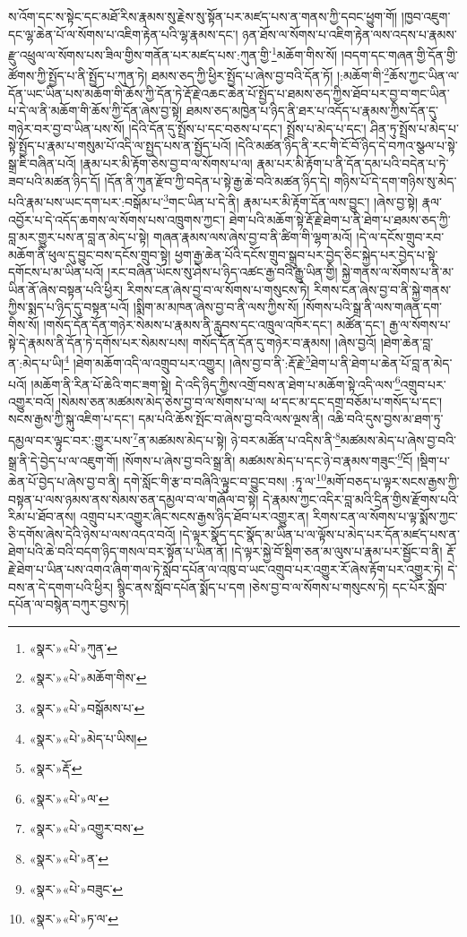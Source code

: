 ས་འོག་དང་ས་སྟེང་དང་མཐོ་རིས་རྣམས་སུ་རྗེས་སུ་སྟོན་པར་མཛད་པས་ན་གནས་ཀྱི་དབང་ཕྱུག་གོ། །ཁྱབ་འཇུག་དང་ལྷ་ཆེན་པོ་ལ་སོགས་པ་འཇིག་རྟེན་པའི་ལྷ་རྣམས་དང་། ཉན་ཐོས་ལ་སོགས་པ་འཇིག་རྟེན་ལས་འདས་པ་རྣམས་རྫུ་འཕྲུལ་ལ་སོགས་པས་ཟིལ་གྱིས་གནོན་པར་མཛད་པས་:ཀུན་གྱི་\footnote{«སྣར་»«པེ་»ཀུན་}མཆོག་གིས་སོ། །བདག་དང་གཞན་གྱི་དོན་གྱི་ཚོགས་ཀྱི་སྤྱོད་པ་ནི་སྤྱོད་པ་ཀུན་ཏེ། ཐམས་ཅད་ཀྱི་ཕྱིར་སྤྱོད་པ་ཞེས་བྱ་བའི་དོན་ཏོ། །:མཆོག་གི་\footnote{«སྣར་»«པེ་»མཆོག་གིས་}ཆོས་ཀྱང་ཡིན་ལ་དོན་ཡང་ཡིན་པས་མཆོག་གི་ཆོས་ཀྱི་དོན་ཏེ་རྡོ་རྗེ་འཆང་ཆེན་པོ་སྤྱོད་པ་ཐམས་ཅད་ཀྱིས་ཐོབ་པར་བྱ་བ་གང་ཡིན་པ་དེ་ལ་ནི་མཆོག་གི་ཆོས་ཀྱི་དོན་ཞེས་བྱ་སྟེ། ཐམས་ཅད་མཁྱེན་པ་ཉིད་ནི་ཐར་པ་འདོད་པ་རྣམས་ཀྱིས་དོན་དུ་གཉེར་བར་བྱ་བ་ཡིན་པས་སོ། །དེའི་དོན་དུ་སྤྲོས་པ་དང་བཅས་པ་དང་། སྤྲོས་པ་མེད་པ་དང་། ཤིན་ཏུ་སྤྲོས་པ་མེད་པ་སྟེ་སྤྱོད་པ་རྣམ་པ་གསུམ་པོ་འདི་ལ་སྤྱད་པས་ན་སྤྱོད་པའོ། །དེའི་མཚན་ཉིད་ནི་རང་གི་ངོ་བོ་ཉིད་དེ་བཀའ་སྩལ་པ་སྟེ་སྒྲ་ཇི་བཞིན་པའོ། །རྣམ་པར་མི་རྟོག་ཅེས་བྱ་བ་ལ་སོགས་པ་ལ། རྣམ་པར་མི་རྟོག་པ་ནི་དོན་དམ་པའི་བདེན་པ་ཏེ་ཟབ་པའི་མཚན་ཉིད་དོ། །དོན་ནི་ཀུན་རྫོབ་ཀྱི་བདེན་པ་སྟེ་རྒྱ་ཆེ་བའི་མཚན་ཉིད་དེ། གཉིས་པོ་དེ་དག་གཉིས་སུ་མེད་པའི་རྣམ་པས་ཡང་དག་པར་:བསྒོམ་པ་\footnote{«སྣར་»«པེ་»བསྒོམས་པ་}གང་ཡིན་པ་དེ་ནི། རྣམ་པར་མི་རྟོག་དོན་ལས་བྱུང་། །ཞེས་བྱ་སྟེ། རྣལ་འབྱོར་པ་དེ་འདོད་ཆགས་ལ་སོགས་པས་འཁྲུགས་ཀྱང་། ཐེག་པའི་མཆོག་སྟེ་རྡོ་རྗེ་ཐེག་པ་ནི་ཐེག་པ་ཐམས་ཅད་ཀྱི་བླ་མར་གྱུར་པས་ན་བླ་ན་མེད་པ་སྟེ། གཞན་རྣམས་ལས་ཞེས་བྱ་བ་ནི་ཚིག་གི་ལྷག་མའོ། །དེ་ལ་དངོས་གྲུབ་རབ་མཆོག་ནི་ཕུལ་དུ་བྱུང་བས་དངོས་གྲུབ་སྟེ། ཕྱག་རྒྱ་ཆེན་པོའི་དངོས་གྲུབ་སྒྲུབ་པར་བྱེད་ཅིང་སྐྱེད་པར་བྱེད་པ་སྟེ་དགོངས་པ་མ་ཡིན་པའོ། །རང་བཞིན་ཡོངས་སུ་ཤེས་པ་ཉིད་འཚང་རྒྱ་བའི་རྒྱུ་ཡིན་གྱི། སྐྱེ་གནས་ལ་སོགས་པ་ནི་མ་ཡིན་ནོ་ཞེས་བསྟན་པའི་ཕྱིར། རིགས་ངན་ཞེས་བྱ་བ་ལ་སོགས་པ་གསུངས་ཏེ། རིགས་ངན་ཞེས་བྱ་བ་ནི་སྐྱེ་གནས་ཀྱིས་སྨད་པ་ཉིད་དུ་བསྟན་པའོ། །སྨིག་མ་མཁན་ཞེས་བྱ་བ་ནི་ལས་ཀྱིས་སོ། །སོགས་པའི་སྒྲ་ནི་ལས་གཞན་དག་གིས་སོ། །གསོད་དོན་དོན་གཉེར་སེམས་པ་རྣམས་ནི་རླུབས་དང་འཁྲུལ་འཁོར་དང་། མཚོན་དང་། རྒྱ་ལ་སོགས་པ་སྟེ་དེ་རྣམས་ནི་དོན་ཏེ་དགོས་པར་སེམས་པས། གསོད་དོན་དོན་དུ་གཉེར་བ་རྣམས། །ཞེས་བྱའོ། །ཐེག་ཆེན་བླ་ན་:མེད་པ་ཡི།\footnote{«སྣར་»«པེ་»མེད་པ་ཡིས།} །ཐེག་མཆོག་འདི་ལ་འགྲུབ་པར་འགྱུར། །ཞེས་བྱ་བ་ནི་:རྡོ་རྗེ་\footnote{«སྣར་»རྡོ་}ཐེག་པ་ནི་ཐེག་པ་ཆེན་པོ་བླ་ན་མེད་པའོ། །མཆོག་ནི་རིན་པོ་ཆེའི་གང་ཟག་སྟེ། དེ་འདི་ཉིད་ཀྱིས་འགྲོ་བས་ན་ཐེག་པ་མཆོག་སྟེ་འདི་ལས་\footnote{«སྣར་»«པེ་»ལ་}འགྲུབ་པར་འགྱུར་བའོ། །སེམས་ཅན་མཚམས་མེད་ཅེས་བྱ་བ་ལ་སོགས་པ་ལ། ཕ་དང་མ་དང་དགྲ་བཅོམ་པ་གསོད་པ་དང་། སངས་རྒྱས་ཀྱི་སྐུ་འཇིག་པ་དང་། དམ་པའི་ཆོས་སྤོང་བ་ཞེས་བྱ་བའི་ལས་ལྔས་ནི། འཆི་བའི་དུས་བྱས་མ་ཐག་ཏུ་དམྱལ་བར་ལྟུང་བར་:གྱུར་པས་\footnote{«སྣར་»«པེ་»འགྱུར་བས་}ན་མཚམས་མེད་པ་སྟེ། ཉེ་བར་མཚོན་པ་འདིས་ནི་\footnote{«སྣར་»«པེ་»ན་}མཚམས་མེད་པ་ཞེས་བྱ་བའི་སྒྲ་ནི་དེ་བྱེད་པ་ལ་འཇུག་གོ། །སོགས་པ་ཞེས་བྱ་བའི་སྒྲ་ནི། མཚམས་མེད་པ་དང་ཉེ་བ་རྣམས་གཟུང་\footnote{«སྣར་»«པེ་»བཟུང་}ངོ། །སྡིག་པ་ཆེན་པོ་བྱེད་པ་ཞེས་བྱ་བ་ནི། དགེ་སློང་གི་རྩ་བ་བཞིའི་ལྟུང་བ་བྱུང་བས། :ཏཱ་ལ་\footnote{«སྣར་»«པེ་»ཏ་ལ་}མགོ་བཅད་པ་ལྟར་སངས་རྒྱས་ཀྱི་བསྟན་པ་ལས་ཉམས་ནས་སེམས་ཅན་དམྱལ་བ་ལ་གཞོལ་བ་སྟེ། དེ་རྣམས་ཀྱང་འདིར་བླ་མའི་དྲིན་གྱིས་རྫོགས་པའི་རིམ་པ་ཐོབ་ནས། འགྲུབ་པར་འགྱུར་ཞིང་སངས་རྒྱས་ཉིད་ཐོབ་པར་འགྱུར་ན། རིགས་ངན་ལ་སོགས་པ་ལྟ་སྨོས་ཀྱང་ཅི་དགོས་ཞེས་དེའི་ཉེས་པ་ལས་འདའ་བའོ། །དེ་ལྟར་སྣོད་དང་སྣོད་མ་ཡིན་པ་ལ་ལྟོས་པ་མེད་པར་དོན་མཛད་པས་ན་ཐེག་པའི་ཆེ་བའི་བདག་ཉིད་གསལ་བར་སྟོན་པ་ཡིན་ནོ། །དེ་ལྟར་སྐྱེ་བོ་སྡིག་ཅན་མ་ལུས་པ་རྣམ་པར་སྦྱོང་བ་ནི། རྡོ་རྗེ་ཐེག་པ་ཡིན་པས་འགའ་ཞིག་གལ་ཏེ་སློབ་དཔོན་ལ་འཁུ་བ་ཡང་འགྲུབ་པར་འགྱུར་རོ་ཞེས་རྟོག་པར་འགྱུར་ཏེ། དེ་བས་ན་དེ་དགག་པའི་ཕྱིར། སྙིང་ནས་སློབ་དཔོན་སྨོད་པ་དག །ཅེས་བྱ་བ་ལ་སོགས་པ་གསུངས་ཏེ། དང་པོར་སློབ་དཔོན་ལ་བསྙེན་བཀུར་བྱས་ཏེ། 
